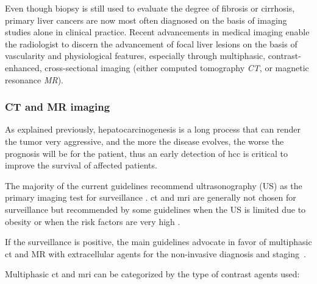 Even though biopsy is still used to evaluate the degree of fibrosis or
cirrhosis, primary liver cancers are now most often diagnosed on the
basis of imaging studies alone in clinical practice. Recent advancements
in medical imaging enable the radiologist to discern the advancement of focal
liver lesions on the basis of vascularity and physiological features,
especially through multiphasic, contrast-enhanced, cross-sectional
imaging (either computed tomography \emph{CT}, or magnetic resonance
\emph{MR}).

\subsubsection{CT and MR imaging}\label{ct-and-mr-imaging}

As explained previously, hepatocarcinogenesis is a long process that can
render the tumor very aggressive, and the more the disease evolves, the
worse the prognosis will be for the patient, thus an early detection of
\ac{hcc} is critical to improve the survival of affected patients.

The majority of the current guidelines recommend ultrasonography (US) as
the primary imaging test for surveillance \cite{Choi2014}. \ac{ct} and \ac{mri} are generally not chosen for surveillance but
recommended by some guidelines when the US is limited due to obesity or
when the risk factors are very high \cite{Omata2010, Llovet2012}.

If the surveillance is positive, the main guidelines advocate in favor
of multiphasic \ac{ct} and MR with extracellular agents for the non-invasive
diagnosis and staging \cite{Kudo2010, Llovet2012, Omata2010, Bruix2011}.

Multiphasic \ac{ct} and \ac{mri} can be categorized by the type of contrast agents
used:

